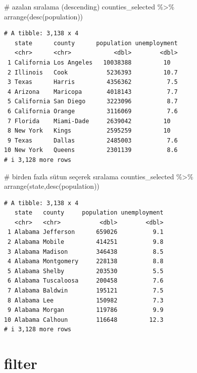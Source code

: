 \documentclass[
  letterpaper,
  DIV=11,
  numbers=noendperiod]{scrreprt}
\newenvironment{Shaded}{\begin{snugshade}}{\end{snugshade}}
\newcommand{\CommentTok}[1]{\textcolor[rgb]{0.37,0.37,0.37}{#1}}
\newcommand{\FunctionTok}[1]{\textcolor[rgb]{0.28,0.35,0.67}{#1}}
\newcommand{\NormalTok}[1]{\textcolor[rgb]{0.00,0.23,0.31}{#1}}
\newcommand{\SpecialCharTok}[1]{\textcolor[rgb]{0.37,0.37,0.37}{#1}}
\begin{document}
\begin{Shaded}
\begin{Highlighting}[]
\CommentTok{\# azalan sıralama (descending)}
\NormalTok{counties\_selected }\SpecialCharTok{\%\textgreater{}\%}
\FunctionTok{arrange}\NormalTok{(}\FunctionTok{desc}\NormalTok{(population))}
\end{Highlighting}
\end{Shaded}

\begin{verbatim}
# A tibble: 3,138 x 4
   state      county      population unemployment
   <chr>      <chr>            <dbl>        <dbl>
 1 California Los Angeles   10038388         10  
 2 Illinois   Cook           5236393         10.7
 3 Texas      Harris         4356362          7.5
 4 Arizona    Maricopa       4018143          7.7
 5 California San Diego      3223096          8.7
 6 California Orange         3116069          7.6
 7 Florida    Miami-Dade     2639042         10  
 8 New York   Kings          2595259         10  
 9 Texas      Dallas         2485003          7.6
10 New York   Queens         2301139          8.6
# i 3,128 more rows
\end{verbatim}

\begin{Shaded}
\begin{Highlighting}[]
\CommentTok{\# birden fazla sütun seçerek sıralama}
\NormalTok{counties\_selected }\SpecialCharTok{\%\textgreater{}\%}
\FunctionTok{arrange}\NormalTok{(state,}\FunctionTok{desc}\NormalTok{(population))}
\end{Highlighting}
\end{Shaded}

\begin{verbatim}
# A tibble: 3,138 x 4
   state   county     population unemployment
   <chr>   <chr>           <dbl>        <dbl>
 1 Alabama Jefferson      659026          9.1
 2 Alabama Mobile         414251          9.8
 3 Alabama Madison        346438          8.5
 4 Alabama Montgomery     228138          8.8
 5 Alabama Shelby         203530          5.5
 6 Alabama Tuscaloosa     200458          7.6
 7 Alabama Baldwin        195121          7.5
 8 Alabama Lee            150982          7.3
 9 Alabama Morgan         119786          9.9
10 Alabama Calhoun        116648         12.3
# i 3,128 more rows
\end{verbatim}

\hypertarget{filter}{%
\section*{filter}\label{filter}}
\end{document}
